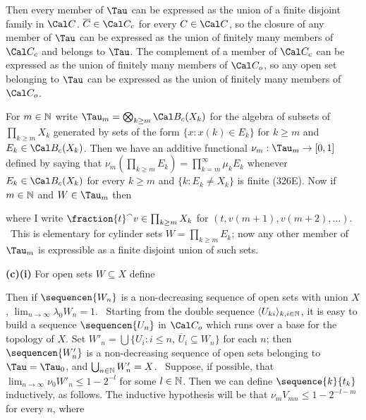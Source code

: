 {

\noindent Then every member of $\Tau$ can be
expressed as the union of a finite disjoint family in $\Cal C$.
$\overline{C}\in\Cal C_c$ for every $C\in\Cal C$, so the closure of any
member of $\Tau$ can be expressed as the union
of finitely many members of $\Cal C_c$ and belongs to $\Tau$.
The complement of a member of $\Cal C_c$
can be expressed as the union of finitely many members of $\Cal C_o$, so
any open set belonging to $\Tau$ can be expressed as the union of
finitely many members of $\Cal C_o$.

\medskip

 For $m\in\Bbb N$ write
$\Tau_m=\bigotimes_{k\ge m}\Cal B_c(X_k)$ for the algebra of
subsets of $\prod_{k\ge m}X_k$ generated by sets of the form
$\{x:x(k)\in E_k\}$ for $k\ge m$ and $E_k\in\Cal B_c(X_k)$.   Then we have an
additive functional $\nu_m:\Tau_m\to[0,1]$ defined by saying that
$\nu_m(\prod_{k\ge m}E_k)=\prod_{k=m}^{\infty}\mu_kE_k$ whenever
$E_k\in\Cal B_c(X_k)$ for every $k\ge m$ and $\{k:E_k\ne X_k\}$ is finite
(326E).   Now if $m\in\Bbb N$ and $W\in\Tau_m$ then


\noindent where I write $\fraction{t}^{\smallfrown}v\in\prod_{k\ge m}X_k$
for
$(t,v(m+1),v(m+2),\ldots)$.   \Prf\ This is elementary for cylinder sets
$W=\prod_{k\ge m}E_k$;  now any other member of $\Tau_m$ is
expressible as a finite disjoint union of such sets.\ \Qed

\medskip

{\bf (c)(i)} For open sets $W\subseteq X$ define


\noindent Then if $\sequencen{W_n}$ is a non-decreasing sequence of open
sets with union $X$, $\lim_{n\to\infty}\lambda_0 W_n=1$.   \Prf\ Starting
from the double sequence $\langle U_{ki}\rangle_{k,i\in\Bbb N}$, it is easy
to build a sequence $\sequencen{U_n}$ in $\Cal C_o$ which runs over a base
for the topology of $X$.   Set
$W'_n=\bigcup\{U_i:i\le n$, $\overline{U}_i\subseteq W_n\}$ for each $n$;
then $\sequencen{W'_n}$ is a non-decreasing sequence of open sets belonging
to $\Tau=\Tau_0$, and $\bigcup_{n\in\Bbb N}W'_n=X$.   \Quer\
Suppose, if possible, that $\lim_{n\to\infty}\nu_0W'_n\le 1-2^{-l}$ for
some $l\in\Bbb N$.   Then we can
define $\sequence{k}{t_k}$ inductively, as follows.   The inductive
hypothesis will be that $\nu_mV_{mn}\le 1-2^{-l-m}$ for every $n$, where

}
